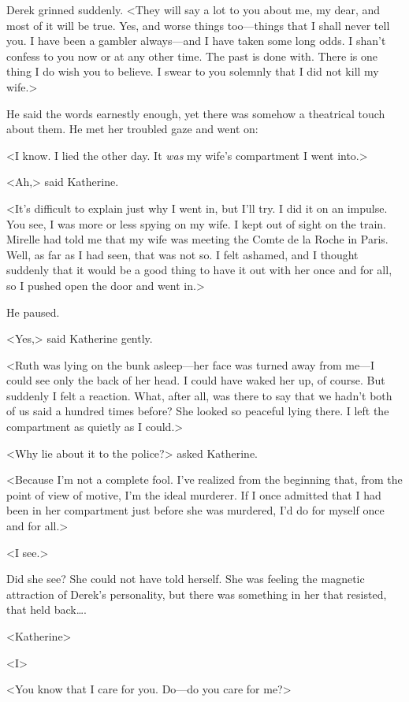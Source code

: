 Derek grinned suddenly. <They will say a lot to you about me, my dear, and most of it will be true. Yes, and worse things too—things that I shall never tell you. I have been a gambler always—and I have taken some long odds. I shan't confess to you now or at any other time. The past is done with. There is one thing I do wish you to believe. I swear to you solemnly that I did not kill my wife.>

He said the words earnestly enough, yet there was somehow a theatrical touch about them. He met her troubled gaze and went on:

<I know. I lied the other day. It \emph{was} my wife's compartment I went into.>

<Ah,> said Katherine.

<It's difficult to explain just why I went in, but I'll try. I did it on an impulse. You see, I was more or less spying on my wife. I kept out of sight on the train. Mirelle had told me that my wife was meeting the Comte de la Roche in Paris. Well, as far as I had seen, that was not so. I felt ashamed, and I thought suddenly that it would be a good thing to have it out with her once and for all, so I pushed open the door and went in.>

He paused.

<Yes,> said Katherine gently.

<Ruth was lying on the bunk asleep—her face was turned away from me—I could see only the back of her head. I could have waked her up, of course. But suddenly I felt a reaction. What, after all, was there to say that we hadn't both of us said a hundred times before? She looked so peaceful lying there. I left the compartment as quietly as I could.>

<Why lie about it to the police?> asked Katherine.

<Because I'm not a complete fool. I've realized from the beginning that, from the point of view of motive, I'm the ideal murderer. If I once admitted that I had been in her compartment just before she was murdered, I'd do for myself once and for all.>

<I see.>

Did she see? She could not have told herself. She was feeling the magnetic attraction of Derek's personality, but there was something in her that resisted, that held back\dots.

<Katherine\longdash>

<I\longdash>

<You know that I care for you. Do—do you care for me?>

